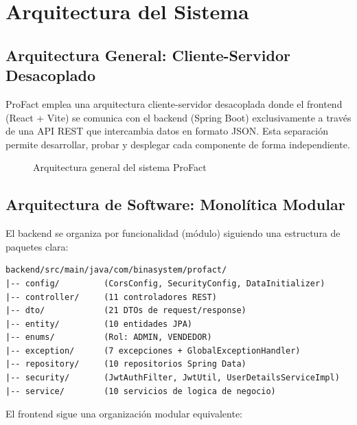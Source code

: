 \documentclass[12pt, letterpaper]{report}
\begin{document}
\section{Arquitectura del Sistema}

\subsection{Arquitectura General: Cliente-Servidor Desacoplado}

ProFact emplea una arquitectura cliente-servidor desacoplada donde el frontend (React + Vite) se comunica con el backend (Spring Boot) exclusivamente a través de una API REST que intercambia datos en formato JSON. Esta separación permite desarrollar, probar y desplegar cada componente de forma independiente.

\begin{figure}[H]
\centering
{}
\caption{Arquitectura general del sistema ProFact}
\label{fig:arq-general}
\end{figure}

\subsection{Arquitectura de Software: Monolítica Modular}

El backend se organiza por funcionalidad (módulo) siguiendo una estructura de paquetes clara:

\begin{lstlisting}[language={},caption={Estructura del backend}]
backend/src/main/java/com/binasystem/profact/
|-- config/         (CorsConfig, SecurityConfig, DataInitializer)
|-- controller/     (11 controladores REST)
|-- dto/            (21 DTOs de request/response)
|-- entity/         (10 entidades JPA)
|-- enums/          (Rol: ADMIN, VENDEDOR)
|-- exception/      (7 excepciones + GlobalExceptionHandler)
|-- repository/     (10 repositorios Spring Data)
|-- security/       (JwtAuthFilter, JwtUtil, UserDetailsServiceImpl)
|-- service/        (10 servicios de logica de negocio)
\end{lstlisting}

El frontend sigue una organización modular equivalente:
\end{document}
